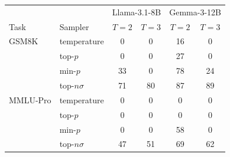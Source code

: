\begin{tabular}{llcccc}
\toprule
 & & \multicolumn{2}{c}{Llama-3.1-8B} & \multicolumn{2}{c}{Gemma-3-12B} \\
Task & Sampler & $T{=}2$ & $T{=}3$ & $T{=}2$ & $T{=}3$ \\
\midrule
GSM8K & temperature & 0 & 0 & 16 & 0 \\
 & top-$p$ & 0 & 0 & 27 & 0 \\
 & min-$p$ & 33 & 0 & 78 & 24 \\
 & top-$n\sigma$ & 71 & 80 & 87 & 89 \\
\midrule
MMLU-Pro & temperature & 0 & 0 & 0 & 0 \\
 & top-$p$ & 0 & 0 & 0 & 0 \\
 & min-$p$ & 0 & 0 & 58 & 0 \\
 & top-$n\sigma$ & 47 & 51 & 69 & 62 \\
\bottomrule
\end{tabular}
